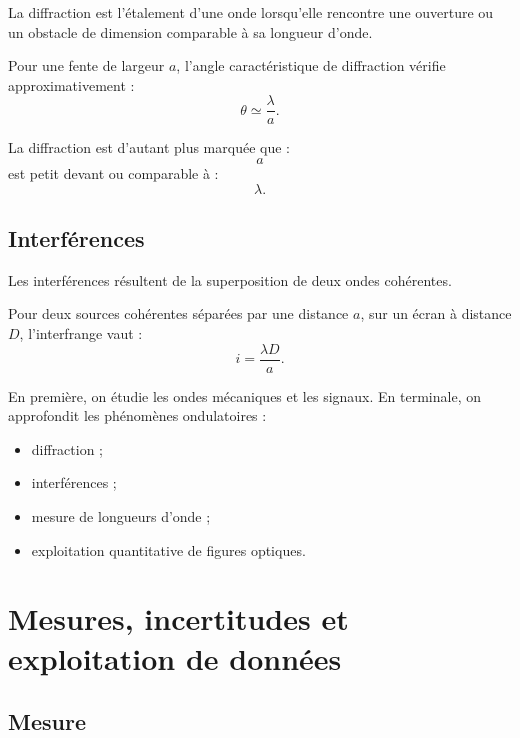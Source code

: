 \documentclass[11pt,a4paper]{article}
\begin{document}
\begin{definition}
La diffraction est l'étalement d'une onde lorsqu'elle rencontre une ouverture ou un obstacle de dimension comparable à sa longueur d'onde.
\end{definition}

Pour une fente de largeur $a$, l'angle caractéristique de diffraction vérifie approximativement :
\[
\theta\simeq \frac{\lambda}{a}.
\]

\begin{alerte}
La diffraction est d'autant plus marquée que :
\[
a
\]
est petit devant ou comparable à :
\[
\lambda.
\]
\end{alerte}

\subsection{Interférences}

\begin{definition}
Les interférences résultent de la superposition de deux ondes cohérentes.
\end{definition}

Pour deux sources cohérentes séparées par une distance $a$, sur un écran à distance $D$, l'interfrange vaut :
\[
i=\frac{\lambda D}{a}.
\]

\begin{transition}
En première, on étudie les ondes mécaniques et les signaux.  
En terminale, on approfondit les phénomènes ondulatoires :
\begin{itemize}
  \item diffraction ;
  \item interférences ;
  \item mesure de longueurs d'onde ;
  \item exploitation quantitative de figures optiques.
\end{itemize}
\end{transition}

\section{Mesures, incertitudes et exploitation de données}

\subsection{Mesure}
\end{document}
